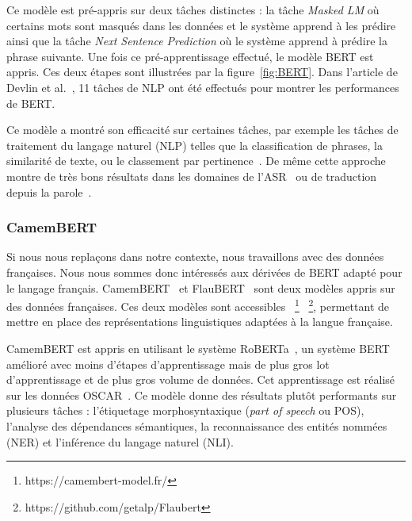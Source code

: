 Ce modèle est pré-appris sur deux tâches distinctes : la tâche \textit{Masked LM} où certains mots sont masqués dans les données et le système apprend à les prédire ainsi que la tâche \textit{Next Sentence Prediction} où le système apprend à prédire la phrase suivante. Une fois ce pré-apprentissage effectué, le modèle BERT est appris. Ces deux étapes sont illustrées par la figure~\ref{fig:BERT}. Dans l'article de Devlin et al.~\cite{Devlin2019}, 11 tâches de NLP ont été effectués pour montrer les performances de BERT.   %



Ce modèle a montré son efficacité sur certaines tâches, par exemple %
les tâches de traitement du langage naturel (NLP) telles que la
classification de phrases, la similarité de texte, ou le classement par pertinence~\cite{Liu2019,Young2018,Yang2019}. De même cette approche montre de très bons résultats dans les domaines de l'ASR~\cite{Kahn2020,Liu2020} ou de traduction depuis la parole~\cite{Nguyen2020}.

\subsubsection{CamemBERT}
Si nous nous replaçons dans notre contexte, nous travaillons avec des données françaises. Nous nous sommes donc intéressés aux dérivées de BERT adapté pour le langage français. CamemBERT~\cite{Martin2020} et FlauBERT~\cite{Le2020} sont deux modèles appris sur des données françaises. Ces deux modèles sont accessibles ~\footnote{https://camembert-model.fr/} ~\footnote{https://github.com/getalp/Flaubert}, permettant de mettre en place des représentations linguistiques adaptées à la langue française.

CamemBERT est appris en utilisant le système RoBERTa~\cite{Liu2019Roberta}, un système BERT amélioré avec moins d'étapes d'apprentissage mais de plus gros lot d'apprentissage et de plus gros volume de données. Cet apprentissage est réalisé sur les données OSCAR~\cite{Ortizsuarez2019}. Ce modèle donne des résultats plutôt performants sur plusieurs tâches : l'étiquetage morphosyntaxique (\textit{part of speech} ou POS), l'analyse des dépendances sémantiques, la reconnaissance des entités nommées (NER) et l'inférence du langage naturel (NLI).

